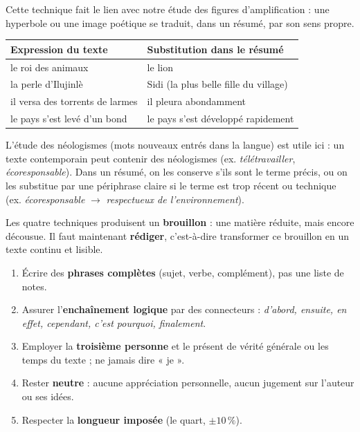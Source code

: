 \documentclass[11pt]{article}
\newcommand{\cle}[1]{{\popxbold\color{popdark}#1}}
\newcounter{popsec}
\newcounter{popsub}
\newcommand{\courssub}[1]{%
  \stepcounter{popsub}%
  \par\vspace{9pt}\noindent{\popxbold\fontsize{11.5}{13}\selectfont\color{popink}{\color{poporange}\thepopsec.\thepopsub}\hspace{6pt}#1}\par\nopagebreak\vspace{4pt}
}
\begin{document}
Cette technique fait le lien avec notre étude des figures d'amplification : une \cle{hyperbole} ou une image poétique se traduit, dans un résumé, par son sens propre.

\begin{center}
\begin{tabularx}{\linewidth}{|X|X|}
\hline
\rowcolor{popblueL} \textbf{Expression du texte} & \textbf{Substitution dans le résumé} \\
\hline
le roi des animaux & le lion \\
\hline
la perle d'Ilujinlè & Sidi (la plus belle fille du village) \\
\hline
il versa des torrents de larmes & il pleura abondamment \\
\hline
le pays s'est levé d'un bond & le pays s'est développé rapidement \\
\hline
\end{tabularx}
\end{center}

\begin{savaistu}
L'étude des \cle{néologismes} (mots nouveaux entrés dans la langue) est utile ici : un texte contemporain peut contenir des néologismes (ex. \emph{télétravailler}, \emph{écoresponsable}). Dans un résumé, on les conserve s'ils sont le terme précis, ou on les substitue par une périphrase claire si le terme est trop récent ou technique (ex. \emph{écoresponsable} $\to$ \emph{respectueux de l'environnement}).
\end{savaistu}

\courssub{La rédaction du résumé}

Les quatre techniques produisent un \textbf{brouillon} : une matière réduite, mais encore décousue. Il faut maintenant \textbf{rédiger}, c'est-à-dire transformer ce brouillon en un texte continu et lisible.

\begin{propriete}
\begin{enumerate}
\item Écrire des \textbf{phrases complètes} (sujet, verbe, complément), pas une liste de notes.
\item Assurer l'\textbf{enchaînement logique} par des connecteurs : \emph{d'abord, ensuite, en effet, cependant, c'est pourquoi, finalement}.
\item Employer la \textbf{troisième personne} et le présent de vérité générale ou les temps du texte ; ne jamais dire « je ».
\item Rester \textbf{neutre} : aucune appréciation personnelle, aucun jugement sur l'auteur ou ses idées.
\item Respecter la \textbf{longueur imposée} (le quart, $\pm 10\,\%$).
\end{enumerate}
\end{propriete}
\end{document}
